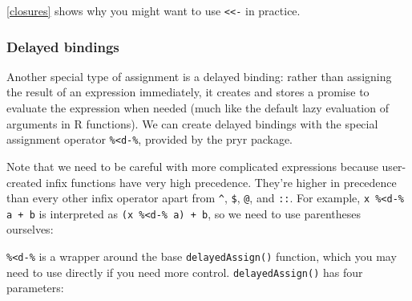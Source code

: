 \documentclass[oneside]{book}
\newenvironment{Shaded}{}{}
\newcommand{\KeywordTok} [1]{\textcolor[rgb]{0.00,0.44,0.13}{{#1}}}
\newcommand{\DecValTok}  [1]{\textcolor[rgb]{0.25,0.63,0.44}{{#1}}}
\newcommand{\StringTok}  [1]{\textcolor[rgb]{0.25,0.44,0.63}{{#1}}}
\newcommand{\CommentTok} [1]{\textcolor[rgb]{0.38,0.63,0.69}{{#1}}}
\newcommand{\NormalTok}  [1]{{#1}}
\renewcommand{\hyperref}[2][???]{\autoref{#1}}
\begin{document}
\hyperref[closures]{Closures} shows why you might want to use
\texttt{\textless{}\textless{}-} in practice.

\subsubsection{Delayed bindings}\label{delayed-bindings}

Another special type of assignment is a delayed binding: rather than
assigning the result of an expression immediately, it creates and stores
a promise to evaluate the expression when needed (much like the default
lazy evaluation of arguments in R functions). We can create delayed
bindings with the special assignment operator
\texttt{\%\textless{}d-\%}, provided by the pryr package.

\begin{Shaded}
\end{Shaded}

Note that we need to be careful with more complicated expressions
because user-created infix functions have very high precedence. They're
higher in precedence than every other infix operator apart from
\texttt{\^{}}, \texttt{\$}, \texttt{@}, and \texttt{::}. For example,
\texttt{x \%\textless{}d-\% a + b} is interpreted as
\texttt{(x \%\textless{}d-\% a) + b}, so we need to use parentheses
ourselves:

\begin{Shaded}
\end{Shaded}

\texttt{\%\textless{}d-\%} is a wrapper around the base
\texttt{delayedAssign()} function, which you may need to use directly if
you need more control. \texttt{delayedAssign()} has four parameters:
\end{document}

